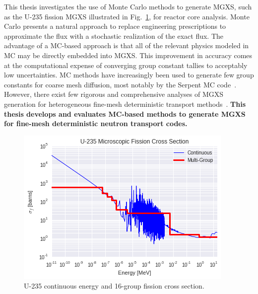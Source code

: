 \documentclass[12pt,twoside]{mitthesis-exec}
\begin{document}


This thesis investigates the use of Monte Carlo methods to generate MGXS, such as the U-235 fission MGXS illustrated in Fig.~\ref{fig:u235-sigf}, for reactor core analysis. Monte Carlo presents a natural approach to replace engineering prescriptions to approximate the flux with a stochastic realization of the exact flux. The advantage of a MC-based approach is that all of the relevant physics modeled in MC may be directly embedded into MGXS. This improvement in accuracy comes at the computational expense of converging group constant tallies to acceptably low uncertainties. MC methods have increasingly been used to generate few group constants for coarse mesh diffusion, most notably by the Serpent MC code~\cite{serpent2013manual}. However, there exist few rigorous and comprehensive analyses of MGXS generation for heterogeneous fine-mesh deterministic transport methods~\cite{redmond1997multigroup,cai2014condensation,nelson2014improved}. \textbf{This thesis develops and evaluates MC-based methods to generate MGXS for fine-mesh deterministic neutron transport codes.}

\begin{figure}[h!]
\centering
\includegraphics[width=0.65\linewidth]{figures/intro/u235-ce-mg-xs}
\caption[U-235 continuous energy and multi-group fission cross section]{U-235 continuous energy and 16-group fission cross section.}
\label{fig:u235-sigf}
\end{figure}
\end{document}
